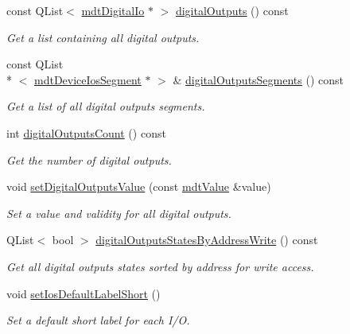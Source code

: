 \begin{DoxyCompactItemize}
const Q\-List$<$ \hyperlink{classmdt_digital_io}{mdt\-Digital\-Io} $\ast$ $>$ \hyperlink{classmdt_device_ios_a74418e6be28a2017140f102484f0df31}{digital\-Outputs} () const 
\begin{DoxyCompactList}\small\item\em Get a list containing all digital outputs. \end{DoxyCompactList}\item 
const Q\-List\\*
$<$ \hyperlink{classmdt_device_ios_segment}{mdt\-Device\-Ios\-Segment} $\ast$ $>$ \& \hyperlink{classmdt_device_ios_ad2b06fe61d71150ac57d77e9bfc7894b}{digital\-Outputs\-Segments} () const 
\begin{DoxyCompactList}\small\item\em Get a list of all digital outputs segments. \end{DoxyCompactList}\item 
int \hyperlink{classmdt_device_ios_a81041e03a387fdcdc2638527b27a0ff6}{digital\-Outputs\-Count} () const 
\begin{DoxyCompactList}\small\item\em Get the number of digital outputs. \end{DoxyCompactList}\item 
void \hyperlink{classmdt_device_ios_a5685ba4a6cee6fad1555dc9b51d1d932}{set\-Digital\-Outputs\-Value} (const \hyperlink{classmdt_value}{mdt\-Value} \&value)
\begin{DoxyCompactList}\small\item\em Set a value and validity for all digital outputs. \end{DoxyCompactList}\item 
Q\-List$<$ bool $>$ \hyperlink{classmdt_device_ios_a67388ae8181a19da07f7b74320a516e3}{digital\-Outputs\-States\-By\-Address\-Write} () const 
\begin{DoxyCompactList}\small\item\em Get all digital outputs states sorted by address for write access. \end{DoxyCompactList}\item 
void \hyperlink{classmdt_device_ios_a100ce7dcaecb7ee9a1a3e68f75cdac73}{set\-Ios\-Default\-Label\-Short} ()
\begin{DoxyCompactList}\small\item\em Set a default short label for each I/\-O. \end{DoxyCompactList}\end{DoxyCompactItemize}


